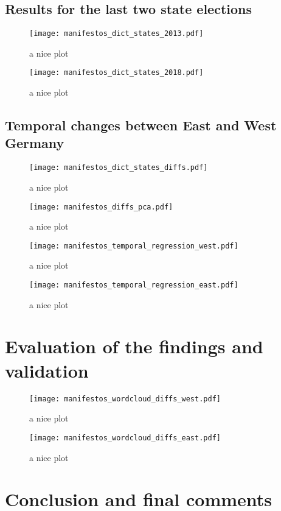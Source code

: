 \documentclass[a4paper]{scrreprt}
\begin{document}
\section{Results for the last two state elections}
\begin{figure}
    \centering
    \texttt{[image: manifestos\_dict\_states\_2013.pdf]}
    \caption{a nice plot}
\end{figure}
\begin{figure}
    \centering
    \texttt{[image: manifestos\_dict\_states\_2018.pdf]}
    \caption{a nice plot}
\end{figure}
\section{Temporal changes between East and West Germany}
\begin{figure}
    \centering
    \texttt{[image: manifestos\_dict\_states\_diffs.pdf]}
    \caption{a nice plot}
\end{figure}
\begin{figure}
    \centering
    \texttt{[image: manifestos\_diffs\_pca.pdf]}
    \caption{a nice plot}
\end{figure}
\begin{figure}
    \centering
    \texttt{[image: manifestos\_temporal\_regression\_west.pdf]}
    \caption{a nice plot}
\end{figure}
\begin{figure}
    \centering
    \texttt{[image: manifestos\_temporal\_regression\_east.pdf]}
    \caption{a nice plot}
\end{figure}
\chapter{Evaluation of the findings and validation}
\begin{figure}
    \centering
    \texttt{[image: manifestos\_wordcloud\_diffs\_west.pdf]}
    \caption{a nice plot}
\end{figure}
\begin{figure}
    \centering
    \texttt{[image: manifestos\_wordcloud\_diffs\_east.pdf]}
    \caption{a nice plot}
\end{figure}
\chapter{Conclusion and final comments}


\end{document}
